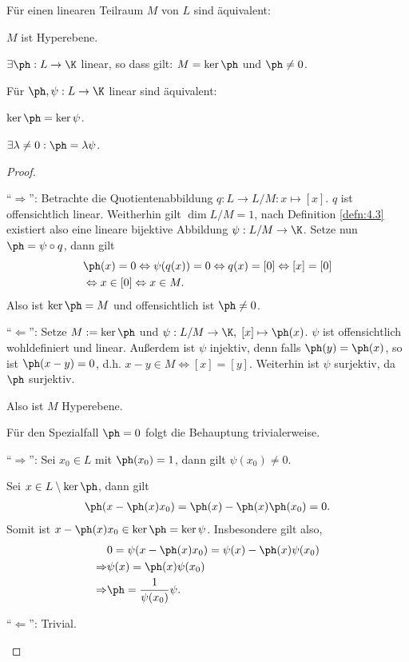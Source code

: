 \begin{prop}
\label{prop:4.4}
\begin{propenum}
  \item Für einen linearen Teilraum $M$ von $L$ sind äquivalent:
  \begin{equivenum}
    \item $M$ ist Hyperebene.
    \item $\exists \ph: L\to \K$ linear, so dass gilt: $M=\ker\ph$ und $\ph\neq
    0$.
  \end{equivenum}
  \item Für $\ph,\psi : L\to\K$ linear sind äquivalent:
  \begin{equivenum}
    \item $\ker\ph = \ker \psi$.
    \item $\exists \lambda\neq 0 : \ph=\lambda\psi$.\fishhere
  \end{equivenum}
  \end{propenum} 
\end{prop}
\begin{proof}
\begin{proofenum}
  \item ``$\Rightarrow$'': Betrachte die Quotientenabbildung $q: L\to L/M :
  x\mapsto [x]$. $q$ ist offensichtlich linear. Weitherhin gilt $\dim L/M = 1$, nach
Definition \ref{defn:4.3} existiert also eine lineare bijektive Abbildung $\psi
: L/M\to \K$.
Setze nun $\ph=\psi\circ q$, dann gilt
\begin{align*}
&\ph(x) = 0 \Leftrightarrow \psi(q(x)) = 0 \Leftrightarrow
q(x) = [0] \Leftrightarrow [x] = [0] \\ & \Leftrightarrow x\in [0]
\Leftrightarrow x\in M.
\end{align*}
Also ist $\ker \ph = M$ und offensichtlich ist $\ph\neq 0$.

``$\Leftarrow$'': Setze $M:=\ker \ph$ und $\psi: L/M\to \K,\; [x]\mapsto
\ph(x)$. $\psi$ ist offensichtlich wohldefiniert und linear. Außerdem ist $\psi$
injektiv, denn falls $\ph(y)=\ph(x)$, so ist $\ph(x-y)=0$, d.h. $x-y\in M
\Leftrightarrow [x]=[y]$. Weiterhin ist $\psi$ surjektiv, da $\ph$ surjektiv.

Also ist $M$ Hyperebene.
\item Für den Spezialfall $\ph=0$ folgt die Behauptung trivialerweise.

 ``$\Rightarrow$'': Sei $x_0\in L$ mit $\ph(x_0) = 1$, dann gilt 
 $\psi(x_0) \neq 0$.
 
 Sei $x\in L\setminus \ker \ph$, dann gilt
 \begin{align*}
 \ph(x-\ph(x)x_0) = \ph(x)-\ph(x)\ph(x_0) = 0.
 \end{align*}
Somit ist $x-\ph(x)x_0\in \ker \ph = \ker \psi$. Insbesondere gilt also,
\begin{align*}
&0 = \psi(x-\ph(x)x_0) = \psi(x) - \ph(x)\psi(x_0)\\
\Rightarrow &\psi(x) = \ph(x)\psi(x_0)\\
\Rightarrow &\ph = \frac{1}{\psi(x_0)}\psi.
\end{align*}

``$\Leftarrow$'': Trivial.\qedhere
\end{proofenum}
\end{proof}

